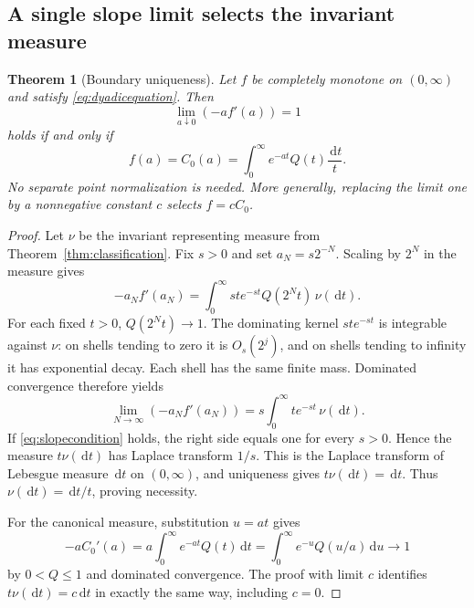 \documentclass[11pt,letterpaper]{article}
\numberwithin{equation}{section}
\newtheorem{theorem}{Theorem}[section]
\theoremstyle{definition}
\theoremstyle{remark}
\newcommand{\dd}{\,\mathrm d}
\begin{document}
\subsection{A single slope limit selects the invariant measure}
\begin{theorem}[Boundary uniqueness]\label{thm:uniqueness}
Let $f$ be completely monotone on $(0,\infty)$ and satisfy
\eqref{eq:dyadicequation}. Then
\begin{equation}\label{eq:slopecondition}
 \lim_{a\downarrow0}(-a f'(a))=1
\end{equation}
holds if and only if
\begin{equation}\label{eq:canonicalunique}
 f(a)=C_0(a)=\int_0^\infty e^{-at}Q(t)\frac{\dd t}{t}.
\end{equation}
No separate point normalization is needed.
More generally, replacing the limit one by a nonnegative constant $c$
selects $f=cC_0$.
\end{theorem}
\begin{proof}
Let $\nu$ be the invariant representing measure from
Theorem~\ref{thm:classification}. Fix $s>0$ and set $a_N=s2^{-N}$.
Scaling by $2^N$ in the measure gives
\begin{equation}\label{eq:slopescale}
 -a_N f'(a_N)
 =\int_0^\infty st e^{-st}Q(2^Nt)\,\nu(\dd t).
\end{equation}
For each fixed $t>0$, $Q(2^Nt)\to1$.
The dominating kernel $st e^{-st}$ is integrable against $\nu$:
on shells tending to zero it is $O_s(2^j)$, and on shells tending to
infinity it has exponential decay. Each shell has the same finite mass.
Dominated convergence therefore yields
\begin{equation}\label{eq:slopelimit}
 \lim_{N\to\infty}(-a_N f'(a_N))
   =s\int_0^\infty t e^{-st}\,\nu(\dd t).
\end{equation}
If \eqref{eq:slopecondition} holds, the right side equals one for every
$s>0$. Hence the measure $t\nu(\dd t)$ has Laplace transform $1/s$.
This is the Laplace transform of Lebesgue measure $\dd t$ on
$(0,\infty)$, and uniqueness gives $t\nu(\dd t)=\dd t$.
Thus $\nu(\dd t)=\dd t/t$, proving necessity.

For the canonical measure, substitution $u=at$ gives
\[
 -aC_0'(a)=a\int_0^\infty e^{-at}Q(t)\dd t
       =\int_0^\infty e^{-u}Q(u/a)\dd u\longrightarrow1
\]
by $0<Q\le1$ and dominated convergence.
The proof with limit $c$ identifies $t\nu(\dd t)=c\dd t$ in exactly the
same way, including $c=0$.
\end{proof}
\end{document}
